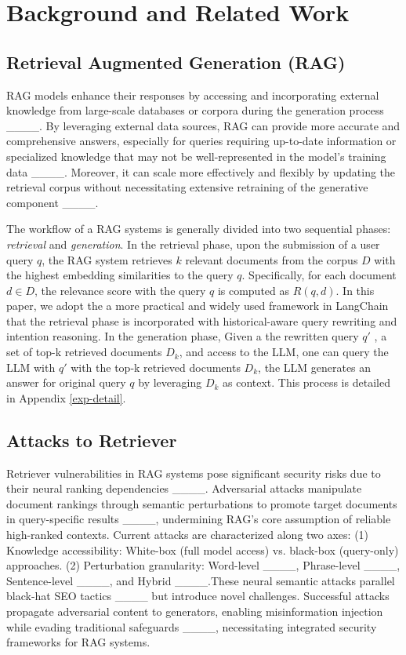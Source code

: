 \section{Background and Related Work}
\subsection{Retrieval Augmented Generation (RAG)}
RAG models enhance their responses by accessing and incorporating external knowledge from large-scale databases or corpora during the generation process ____. By leveraging external data sources, RAG can provide more accurate and comprehensive answers, especially for queries requiring up-to-date information or specialized knowledge that may not be well-represented in the model's training data ____. Moreover, it can scale more effectively and flexibly by updating the retrieval corpus without necessitating extensive retraining of the generative component ____.


The workflow of a RAG systems is generally divided into two sequential phases: \textit{retrieval} and \textit{generation}. 
In the retrieval phase, upon the submission of a user query $q$, the RAG system retrieves $k$ relevant documents from the corpus $D$ with the highest embedding similarities to the query $q$. Specifically, for each document $d \in D$, the relevance score with the query $q$ is computed as $R(q, d)$. In this paper, we adopt the a more practical and widely used framework in LangChain that the retrieval phase is incorporated with historical-aware query rewriting and intention reasoning. 
In the generation phase, Given a the rewritten query $q'$ , a set of top-k retrieved documents $D_k$, and access to the LLM, one can query the LLM with $q'$ with the top-k retrieved documents $D_k$, the LLM generates an answer for original query $q$ by leveraging $D_k$ as context. This process is detailed in Appendix \ref{exp-detail}.

\subsection{Attacks to Retriever}

Retriever vulnerabilities in RAG systems pose significant security risks due to their neural ranking dependencies ____. Adversarial attacks manipulate document rankings through semantic perturbations to promote target documents in query-specific results ____, undermining RAG's core assumption of reliable high-ranked contexts.
Current attacks are characterized along two axes: (1) Knowledge accessibility: White-box (full model access) vs. black-box (query-only) approaches. (2) Perturbation granularity: Word-level ____, Phrase-level ____, Sentence-level ____, and Hybrid ____.These neural semantic attacks parallel black-hat SEO tactics ____ but introduce novel challenges. Successful attacks propagate adversarial content to generators, enabling misinformation injection while evading traditional safeguards ____, necessitating integrated security frameworks for RAG systems.

